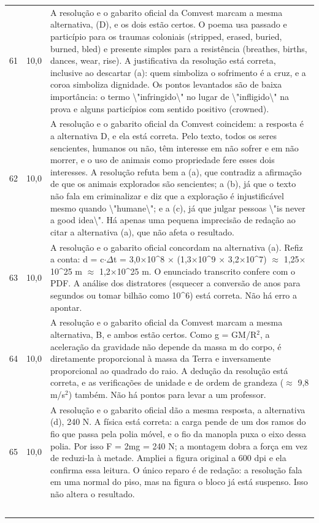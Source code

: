 \documentclass{article}%
\begin{document}
\begin{longtable}{@{}c c p{}@{}}
61 & 10,0 & A resolução e o gabarito oficial da Comvest marcam a mesma alternativa, (D), e os dois estão certos. O poema usa passado e particípio para os traumas coloniais (stripped, erased, buried, burned, bled) e presente simples para a resistência (breathes, births, dances, wear, rise). A justificativa da resolução está correta, inclusive ao descartar (a): quem simboliza o sofrimento é a cruz, e a coroa simboliza dignidade. Os pontos levantados são de baixa importância: o termo \textbackslash{}"infringido\textbackslash{}" no lugar de \textbackslash{}"infligido\textbackslash{}" na prova e alguns particípios com sentido positivo (crowned). \\
62 & 10,0 & A resolução e o gabarito oficial da Comvest coincidem: a resposta é a alternativa D, e ela está correta. Pelo texto, todos os seres sencientes, humanos ou não, têm interesse em não sofrer e em não morrer, e o uso de animais como propriedade fere esses dois interesses. A resolução refuta bem a (a), que contradiz a afirmação de que os animais explorados são sencientes; a (b), já que o texto não fala em criminalizar e diz que a exploração é injustificável mesmo quando \textbackslash{}"humane\textbackslash{}"; e a (c), já que julgar pessoas \textbackslash{}"is never a good idea\textbackslash{}". Há apenas uma pequena imprecisão de redação ao citar a alternativa (a), que não afeta o resultado. \\
63 & 10,0 & A resolução e o gabarito oficial concordam na alternativa (a). Refiz a conta: d = c$\cdot$$\Delta$t = 3,0$\times$10\^{}8 $\times$ (1,3$\times$10\^{}9 $\times$ 3,2$\times$10\^{}7) $\approx$ 1,25$\times$10\^{}25 m $\approx$ 1,2$\times$10\^{}25 m. O enunciado transcrito confere com o PDF. A análise dos distratores (esquecer a conversão de anos para segundos ou tomar bilhão como 10\^{}6) está correta. Não há erro a apontar. \\
64 & 10,0 & A resolução e o gabarito oficial da Comvest marcam a mesma alternativa, B, e ambos estão certos. Como g = GM/R$^2$, a aceleração da gravidade não depende da massa m do corpo, é diretamente proporcional à massa da Terra e inversamente proporcional ao quadrado do raio. A dedução da resolução está correta, e as verificações de unidade e de ordem de grandeza ($\approx$ 9,8 m/s$^2$) também. Não há pontos para levar a um professor. \\
65 & 10,0 & A resolução e o gabarito oficial dão a mesma resposta, a alternativa (d), 240 N. A física está correta: a carga pende de um dos ramos do fio que passa pela polia móvel, e o fio da manopla puxa o eixo dessa polia. Por isso F = 2mg = 240 N; a montagem dobra a força em vez de reduzi{-}la à metade. Ampliei a figura original a 600 dpi e ela confirma essa leitura. O único reparo é de redação: a resolução fala em uma normal do piso, mas na figura o bloco já está suspenso. Isso não altera o resultado. \\
$$
\end{longtable}
\end{document}
